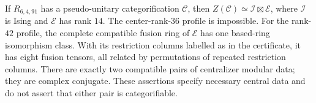 \begin{theorem}
\label{thm:91-centralizer-completion}
If $R_{6,4,91}$ has a pseudo-unitary categorification $\mathcal C$, then
$Z(\mathcal C)\simeq\mathcal I\boxtimes\mathcal E$, where $\mathcal I$
is Ising and $\mathcal E$ has rank $14$. The center-rank-$36$ profile is
impossible. For the rank-$42$ profile, the complete compatible fusion
ring of $\mathcal E$ has one based-ring isomorphism class. With its
restriction columns labelled as in the certificate, it has eight fusion
tensors, all related by permutations of repeated restriction columns.
There are exactly two compatible pairs of centralizer modular data;
they are complex conjugate. These assertions specify necessary central
data and do not assert that either pair is categorifiable.
\end{theorem}
